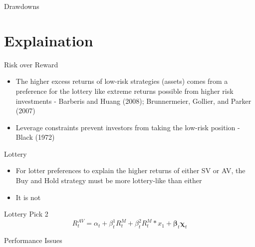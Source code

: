\documentclass{beamer}
\begin{document}
\begin{frame}{Drawdowns}
	\begin{adjustbox}{width=\textwidth}
		
	\end{adjustbox}
	\begin{adjustbox}{width=\textwidth}
		
	\end{adjustbox}
\end{frame}

\section{Explaination}
\begin{frame}{Risk over Reward}
	\begin{itemize}
		\item The higher excess returns of low-risk strategies (assets) comes from a preference for the lottery like extreme returns possible from higher risk investments - Barberis and Huang (2008); Brunnermeier, Gollier, and Parker (2007)
		\item Leverage constraints prevent investors from taking the low-risk position - Black (1972)
	\end{itemize}
\end{frame}

\begin{frame}{Lottery}
	\begin{itemize}
		\item For lotter preferences to explain the higher returns of either SV or AV, the Buy and Hold strategy must be more lottery-like than either
		\item It is not
	\end{itemize}
		\begin{adjustbox}{width=\textwidth}
			
		\end{adjustbox}
\end{frame}

\begin{frame}{Lottery Pick 2}
		\begin{equation}
		R^{AV}_{t} = \alpha_{t} + \beta^{1}_{t} R^{M}_{t} + \beta^{2}_{t} R^{M}_{t}*x_{1} + \boldsymbol{\beta}_{t}\boldsymbol{\chi}_{t}
		\end{equation}
		\begin{adjustbox}{width=\textwidth,height=4cm}
			
		\end{adjustbox}
\end{frame}

\begin{frame}{Performance Issues}
	\begin{adjustbox}{width=\textwidth}
		
	\end{adjustbox}
\end{frame}
\end{document}

